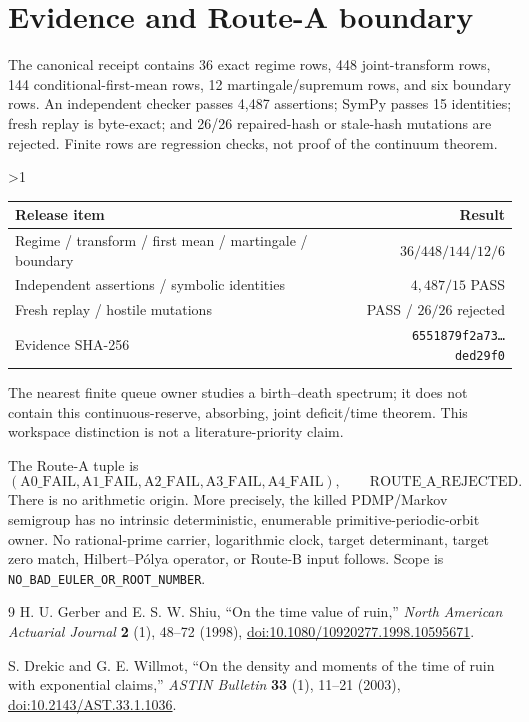 \documentclass[10pt]{article}
\providecommand{\CRevisionRound}{2}
\begin{document}
\section{Evidence and Route-A boundary}
The canonical receipt contains 36 exact regime rows, 448 joint-transform rows,
144 conditional-first-mean rows, 12 martingale/supremum rows, and six boundary
rows.  An independent checker passes 4,487 assertions;
SymPy passes 15 identities; fresh replay is byte-exact; and 26/26 repaired-hash
or stale-hash mutations are
rejected.  Finite rows are regression checks, not proof of the continuum
theorem.

\ifnum\CRevisionRound>1
\begin{center}
\small
\begin{tabular}{@{}lr@{}}
\toprule
Release item&Result\\
\midrule
Regime / transform / first mean / martingale / boundary&$36/448/144/12/6$\\
Independent assertions / symbolic identities&$4{,}487/15$ PASS\\
Fresh replay / hostile mutations&PASS / $26/26$ rejected\\
Evidence SHA-256&\texttt{6551879f2a73\ldots ded29f0}\\
\bottomrule
\end{tabular}
\end{center}

The nearest finite queue owner studies a birth--death spectrum; it does not
contain this continuous-reserve, absorbing, joint deficit/time theorem.  This
workspace distinction is not a literature-priority claim.
\fi

The Route-A tuple is
\[
(\mathrm{A0\_FAIL},\mathrm{A1\_FAIL},\mathrm{A2\_FAIL},
 \mathrm{A3\_FAIL},\mathrm{A4\_FAIL}),\qquad
\mathrm{ROUTE\_A\_REJECTED}. \tag{10}
\]
There is no arithmetic origin.  More precisely, the killed PDMP/Markov
semigroup has no intrinsic deterministic, enumerable primitive-periodic-orbit
owner.  No rational-prime carrier, logarithmic clock, target determinant,
target zero match, Hilbert--P\'olya operator, or Route-B input follows.  Scope is
\texttt{NO\_BAD\_EULER\_OR\_ROOT\_NUMBER}.

\begin{thebibliography}{9}
H. U. Gerber and E. S. W. Shiu, ``On the time value of ruin,''
\emph{North American Actuarial Journal} \textbf{2} (1), 48--72 (1998),
\href{https://doi.org/10.1080/10920277.1998.10595671}{doi:10.1080/10920277.1998.10595671}.

S. Drekic and G. E. Willmot, ``On the density and moments of the time of ruin
with exponential claims,'' \emph{ASTIN Bulletin} \textbf{33} (1), 11--21
(2003), \href{https://doi.org/10.2143/AST.33.1.1036}{doi:10.2143/AST.33.1.1036}.
\end{thebibliography}
\end{document}
